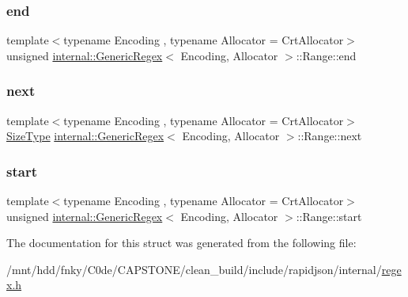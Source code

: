 \subsubsection{\texorpdfstring{end}{end}}
{\footnotesize\ttfamily template$<$typename Encoding , typename Allocator  = Crt\+Allocator$>$ \\
unsigned \hyperlink{classinternal_1_1GenericRegex}{internal\+::\+Generic\+Regex}$<$ Encoding, Allocator $>$\+::Range\+::end}

\mbox{\label{structinternal_1_1GenericRegex_1_1Range_abaff4592e1947f5368339ebfa7ad9f7f}} 
\subsubsection{\texorpdfstring{next}{next}}
{\footnotesize\ttfamily template$<$typename Encoding , typename Allocator  = Crt\+Allocator$>$ \\
\hyperlink{rapidjson_8h_a5ed6e6e67250fadbd041127e6386dcb5}{Size\+Type} \hyperlink{classinternal_1_1GenericRegex}{internal\+::\+Generic\+Regex}$<$ Encoding, Allocator $>$\+::Range\+::next}

\mbox{\label{structinternal_1_1GenericRegex_1_1Range_a7b407235cac7d4245b984c970c8b2026}} 
\subsubsection{\texorpdfstring{start}{start}}
{\footnotesize\ttfamily template$<$typename Encoding , typename Allocator  = Crt\+Allocator$>$ \\
unsigned \hyperlink{classinternal_1_1GenericRegex}{internal\+::\+Generic\+Regex}$<$ Encoding, Allocator $>$\+::Range\+::start}



The documentation for this struct was generated from the following file\+:\begin{DoxyCompactItemize}
\item 
/mnt/hdd/fnky/\+C0de/\+C\+A\+P\+S\+T\+O\+N\+E/clean\+\_\+build/include/rapidjson/internal/\hyperlink{regex_8h}{regex.\+h}\end{DoxyCompactItemize}
